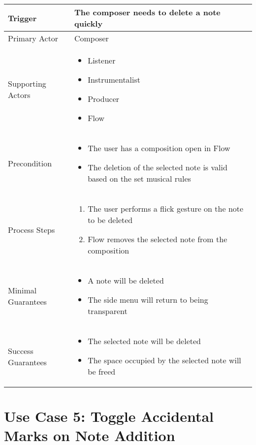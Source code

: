   \begin{tabularx}{\textwidth}{|X|X|}
  \hline
  Trigger & 
  The composer needs to delete a note quickly \\
  \hline
  Primary Actor & 
  Composer\\
  \hline
  Supporting Actors & 
  \begin{itemize}
  \item Listener
  \item Instrumentalist
  \item Producer
  \item Flow
  \end{itemize} \\
  \hline
  Precondition & 
  \begin{itemize}
  \item The user has a composition open in Flow 
  \item The deletion of the selected note is valid based on the set musical rules
  \end{itemize} \\
  \hline
  Process Steps & 
  \begin{enumerate}
  \item The user performs a flick gesture on the note to be deleted
  \item Flow removes the selected note from the composition
  \end{enumerate} \\
  \hline
  Minimal Guarantees & 
  \begin{itemize}
    \item A note will be deleted
    \item The side menu will return to being transparent
  \end{itemize} \\
  \hline
  Success Guarantees & 
  \begin{itemize}
    \item The selected note will be deleted
    \item The space occupied by the selected note will be freed
  \end{itemize} \\
  \hline
  \end{tabularx}

  \section{Use Case 5: Toggle Accidental Marks on Note Addition}


